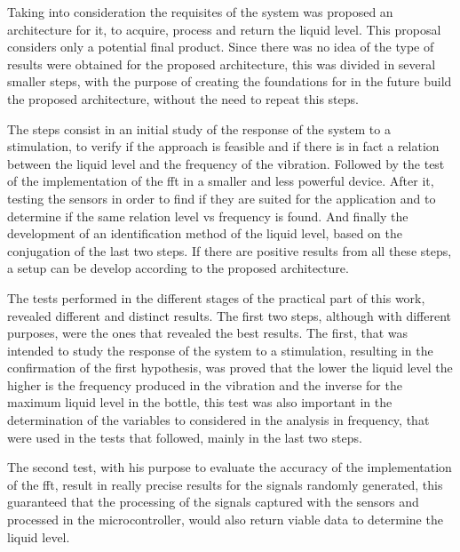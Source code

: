 Taking into consideration the requisites of the system was proposed an architecture for it, to acquire, process and return the liquid level. This proposal considers only a potential final product. Since there was no idea of the type of results were obtained for the proposed architecture, this was divided in several smaller steps, with the purpose of creating the foundations for in the future build the proposed architecture, without the need to repeat this steps.

The steps consist in an initial study of the response of the system to a stimulation, to verify if the approach is feasible and if there is in fact a relation between the liquid level and the frequency of the vibration. Followed by the test of the implementation of the \acrshort{fft} in a smaller and less powerful device. After it, testing the sensors in order to find if they are suited for the application and to determine if the same relation level vs frequency is found. And finally the development of an identification method of the liquid level, based on the conjugation of the last two steps. If there are positive results from all these steps, a setup can be develop according to the proposed architecture.

The tests performed in the different stages of the practical part of this work, revealed different and distinct results. The first two steps, although with different purposes, were the ones that revealed the best results. The first, that was intended to study the response of the system to a stimulation, resulting in the confirmation of the first hypothesis, was proved that the lower the liquid level the higher is the frequency produced in the vibration and the inverse for the maximum liquid level in the bottle, this test was also important in the determination of the variables to considered in the analysis in frequency, that were used in the tests that followed, mainly in the last two steps.

The second test, with his purpose to evaluate the accuracy of the implementation of the \acrshort{fft}, result in really precise results for the signals randomly generated, this guaranteed that the processing of the signals captured with the sensors and processed in the microcontroller, would also return viable data to determine the liquid level.

